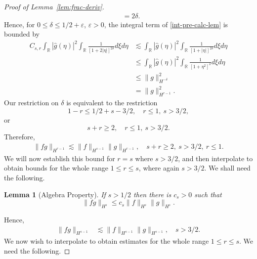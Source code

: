 \documentclass[12pt,reqno]{amsart}
\numberwithin{equation}{section}  %
\numberwithin{figure}{section}
\newcommand{\rr}{\mathbb{R}}
\newcommand{\wh}{\widehat}
\newcommand{\ee}{\varepsilon}
\newtheorem{lemma}[theorem]{Lemma}
\begin{document}
\begin{proof}[Proof of Lemma~\ref{lem:frac-deriv}]
\begin{equation*}
\begin{split}
  & = 2\delta.
\end{split}
\end{equation*}
%
Hence, for $0 \le \delta \le 1/2 + \ee$, $\ee >
0$, the integral term of \eqref{int-pre-calc-lem} is bounded by
\begin{equation*}
\begin{split}
  C_{s,r} \int_{\rr}  | \wh{g}(\eta) |^{2} \int_{\rr} \frac{1}{\left[ 1
  + 2 |\eta| \right]^{2 \delta}} d \xi d \eta 
  & \lesssim
  \int_{\rr}  | \wh{g}(\eta) |^{2} \int_{\rr} \frac{1}{\left[ 1
  + |\eta| \right]^{2 \delta}} d \xi d \eta  
  \\
  & \le \int_{\rr}  | \wh{g}(\eta) |^{2} \int_{\rr} \frac{1}{\left[ 1
  + \eta^{2} \right]^{\delta}} d \xi d \eta  
  \\
  & \le \| g \|_{H^{-\delta}}^{2}
  \\
  & = \| g \|_{H^{r-1}}^{2}.
\end{split}
\end{equation*}
%
Our restriction on $\delta$ is equivalent to the restriction 
$$1-r \le 1/2 + s - 3/2, \quad r \le 1, \ s > 3/2,$$ or
$$s + r \ge 2,  \quad  r \le 1, \ s > 3/2.$$ Therefore, 
%
%
%
%
\begin{equation}
  \label{yhh}
\begin{split}
  \| f g \|_{H^{r-1}} \lesssim \| f \|_{H^{s-1}} \| g \|_{H^{r-1}},
  \quad s + r \ge 2, \ s > 3/2, \ r \le 1.
\end{split}
\end{equation}
We will now establish this bound for $r=s$ where $s > 3/2$, and then interpolate to obtain
bounds for the whole range $1 \le r \le s$, where again $s > 3/2$. We shall need the following. 
%
%
\begin{lemma}[Algebra Property]
  \label{lem:alg-prop}
If  $s>1/2$ then there is $c_s>0$ such that 
%
%
%
\begin{equation} \label{KP-com-est}
  \| fg\|_{H^{s}} \le c_s \| f \|_{H^{s}} \| g \|_{H^{s}}.
\end{equation}
%
%
%
\end{lemma}
%
%
%
%
%
Hence,
%
%
\begin{equation}
  \label{pre-interp-1}
\begin{split}
  \| f g \|_{H^{s-1}}
  & \lesssim   \|f  \|_{H^{s-1}} \| g \|_{H^{s-1}}, \quad s >3/2.
\end{split}
\end{equation}
%
%
%
%
%
%
%
We now wish to interpolate to obtain estimates for the whole range $1 \le r \le s$.
We need the following.
%

\end{proof}
\end{document}

